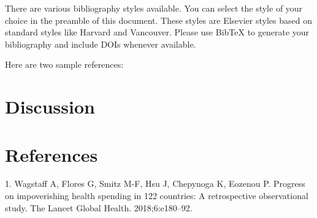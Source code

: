 \documentclass[]{elsarticle} %
\begin{document}
There are various bibliography styles available. You can select the
style of your choice in the preamble of this document. These styles are
Elsevier styles based on standard styles like Harvard and Vancouver.
Please use BibTeX to generate your bibliography and include DOIs
whenever available.

Here are two sample references:

\hypertarget{discussion}{%
\section{Discussion}\label{discussion}}

\hypertarget{references}{%
\section*{References}\label{references}}

\hypertarget{refs}{}
\leavevmode\hypertarget{ref-wagstaff2018progress}{}%
1. Wagstaff A, Flores G, Smitz M-F, Hsu J, Chepynoga K, Eozenou P. Progress on impoverishing health spending in 122 countries: A retrospective observational study. The Lancet Global Health. 2018;6:e180--92.
\end{document}
